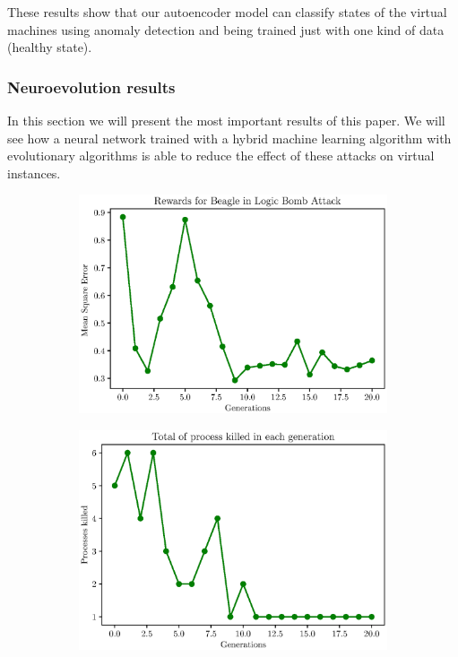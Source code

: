 \documentclass{iosart2c}
\begin{document}
These results show that our autoencoder model can classify states of the virtual machines using anomaly detection and being trained just with one kind of data (healthy state).


\subsubsection{Neuroevolution results}

In this section we will present the most important results of this paper. We will see how a neural network trained with a hybrid machine learning algorithm with evolutionary algorithms is able to reduce the effect of these attacks on virtual instances. \\


\begin{figure}[h!]
\begin{subfigure}{.49\linewidth}
\centering
\includegraphics[width=\linewidth]{figs/results/reward_best_agent_final.eps}
\end{subfigure}
\begin{subfigure}{.49\linewidth}
\centering
\includegraphics[width=\linewidth]{figs/results/number_process_final_top_agent.eps}

\end{subfigure}
\end{figure}
\end{document}
